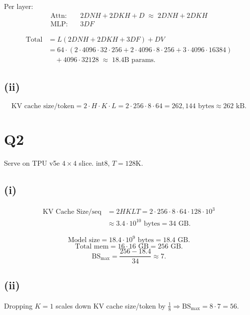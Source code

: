 \documentclass[11pt]{article}
\begin{document}
Per layer:
\begin{align*}
\text{Attn:} \quad & 2DNH + 2DKH + D \;\approx\; 2DNH + 2DKH \\
\text{MLP:}  \quad & 3DF
\end{align*}

\begin{align*}
\text{Total} &= L(2DNH + 2DKH + 3DF) + DV \\
&= 64 \cdot (2 \cdot 4096 \cdot 32 \cdot 256 + 2 \cdot 4096 \cdot 8 \cdot 256 + 3 \cdot 4096 \cdot 16384) \\
&\quad + 4096 \cdot 32128 \;\approx\; 18.4\text{B params.}
\end{align*}

\subsection*{(ii)}

\[
\text{KV cache size/token} = 2 \cdot H \cdot K \cdot L = 2 \cdot 256 \cdot 8 \cdot 64 = 262{,}144 \text{ bytes} \approx 262 \text{ kB}.
\]

\section*{Q2}

Serve on TPU v5e $4 \times 4$ slice. int8, $T = 128$K.

\subsection*{(i)}

\begin{align*}
\text{KV Cache Size/seq} &= 2HKLT = 2 \cdot 256 \cdot 8 \cdot 64 \cdot 128 \cdot 10^3 \\
&\approx 3.4 \cdot 10^{10} \text{ bytes} = 34 \text{ GB}.
\end{align*}

\[
\text{Model size} = 18.4 \cdot 10^9 \text{ bytes} = 18.4 \text{ GB}.
\]
\[
\text{Total mem} = 16 \cdot 16 \text{ GB} = 256 \text{ GB}.
\]
\[
\text{BS}_{\max} = \frac{256 - 18.4}{34} \approx 7.
\]

\subsection*{(ii)}

Dropping $K = 1$ scales down KV cache size/token by $\frac{1}{8} \Rightarrow \text{BS}_{\max} = 8 \cdot 7 = 56$.
\end{document}
